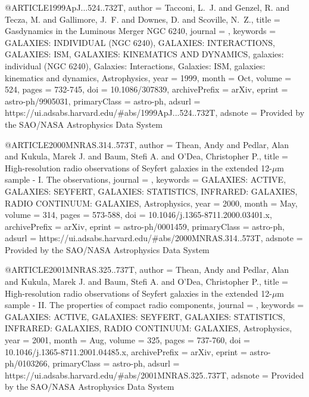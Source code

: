 \documentclass[longauth]{aa}
\begin{document}
{{{{@ARTICLE{1999ApJ...524..732T,
       author = {{Tacconi}, L.~J. and {Genzel}, R. and {Tecza}, M. and {Gallimore}, J.~F. and {Downes}, D. and {Scoville}, N.~Z.},
        title = {Gasdynamics in the Luminous Merger NGC 6240},
      journal = {\apj},
     keywords = {GALAXIES: INDIVIDUAL (NGC 6240), GALAXIES: INTERACTIONS, GALAXIES: ISM, GALAXIES: KINEMATICS AND DYNAMICS, galaxies: individual (NGC 6240), Galaxies: Interactions, Galaxies: ISM, galaxies: kinematics and dynamics, Astrophysics},
         year = 1999,
        month = Oct,
       volume = {524},
        pages = {732-745},
          doi = {10.1086/307839},
archivePrefix = {arXiv},
       eprint = {astro-ph/9905031},
 primaryClass = {astro-ph},
       adsurl = {https://ui.adsabs.harvard.edu/#abs/1999ApJ...524..732T},
      adsnote = {Provided by the SAO/NASA Astrophysics Data System}
}

@ARTICLE{2000MNRAS.314..573T,
       author = {{Thean}, Andy and {Pedlar}, Alan and {Kukula}, Marek J. and {Baum}, Stefi A. and {O'Dea}, Christopher P.},
        title = {High-resolution radio observations of Seyfert galaxies in the extended 12-{\ensuremath{\mu}}m sample - I. The observations},
      journal = {\mnras},
     keywords = {GALAXIES: ACTIVE, GALAXIES: SEYFERT, GALAXIES: STATISTICS, INFRARED: GALAXIES, RADIO CONTINUUM: GALAXIES, Astrophysics},
         year = 2000,
        month = May,
       volume = {314},
        pages = {573-588},
          doi = {10.1046/j.1365-8711.2000.03401.x},
archivePrefix = {arXiv},
       eprint = {astro-ph/0001459},
 primaryClass = {astro-ph},
       adsurl = {https://ui.adsabs.harvard.edu/#abs/2000MNRAS.314..573T},
      adsnote = {Provided by the SAO/NASA Astrophysics Data System}
}

@ARTICLE{2001MNRAS.325..737T,
       author = {{Thean}, Andy and {Pedlar}, Alan and {Kukula}, Marek J. and {Baum}, Stefi A. and {O'Dea}, Christopher P.},
        title = {High-resolution radio observations of Seyfert galaxies in the extended 12-{\ensuremath{\mu}}m sample - II. The properties of compact radio components},
      journal = {\mnras},
     keywords = {GALAXIES: ACTIVE, GALAXIES: SEYFERT, GALAXIES: STATISTICS, INFRARED: GALAXIES, RADIO CONTINUUM: GALAXIES, Astrophysics},
         year = 2001,
        month = Aug,
       volume = {325},
        pages = {737-760},
          doi = {10.1046/j.1365-8711.2001.04485.x},
archivePrefix = {arXiv},
       eprint = {astro-ph/0103266},
 primaryClass = {astro-ph},
       adsurl = {https://ui.adsabs.harvard.edu/#abs/2001MNRAS.325..737T},
      adsnote = {Provided by the SAO/NASA Astrophysics Data System}
}

}}}}
\end{document}
